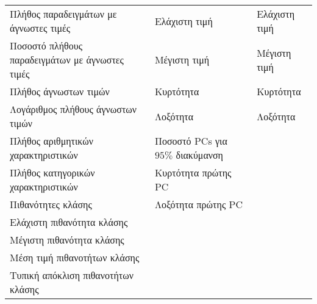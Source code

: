 \begin{itemize}
\begin{table}[!htb]
\begin{center}
\begin{tabular}{ |l l l | }
	 			Πλήθος παραδειγμάτων με άγνωστες τιμές & Ελάχιστη τιμή & Ελάχιστη τιμή    \\
	 			Ποσοστό πλήθους παραδειγμάτων με άγνωστες τιμές & Μέγιστη τιμή & Μέγιστη τιμή   \\
	 			Πλήθος άγνωστων τιμών & Κυρτότητα & Κυρτότητα  \\
	 			Λογάριθμος πλήθους άγνωστων τιμών & Λοξότητα & Λοξότητα \\
	 			Πλήθος αριθμητικών χαρακτηριστικών & Ποσοστό \gls{PC}s για $95\%$ διακύμανση & \\
	 			Πλήθος κατηγορικών χαρακτηριστικών &  Κυρτότητα πρώτης \gls{PC}& \\
	 			Πιθανότητες κλάσης & Λοξότητα πρώτης \gls{PC}& \\
	 			Ελάχιστη πιθανότητα κλάσης & &   \\
                Μέγιστη πιθανότητα κλάσης & &  \\
                Μέση τιμή πιθανοτήτων κλάσης & &  \\
                Τυπική απόκλιση πιθανοτήτων κλάσης &  & \\
                \hline
	 		\end{tabular}    
	 	\end{center}
	 \end{table}
	

\end{itemize}
